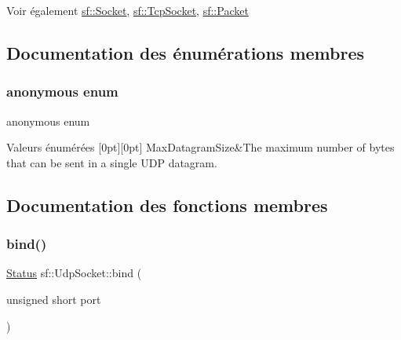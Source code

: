 \begin{DoxySeeAlso}{Voir également}
\hyperlink{classsf_1_1Socket}{sf\+::\+Socket}, \hyperlink{classsf_1_1TcpSocket}{sf\+::\+Tcp\+Socket}, \hyperlink{classsf_1_1Packet}{sf\+::\+Packet} 
\end{DoxySeeAlso}


\subsection{Documentation des énumérations membres}
\mbox{\label{classsf_1_1UdpSocket_a14c7b7816e33ed1ef1f2fdb2404c06b5}} 
\subsubsection{\texorpdfstring{anonymous enum}{anonymous enum}}
{\footnotesize\ttfamily anonymous enum}

\begin{DoxyEnumFields}{Valeurs énumérées}
[0pt][0pt]{}\mbox{\label{classsf_1_1UdpSocket_a14c7b7816e33ed1ef1f2fdb2404c06b5a728a7d33027bee0d65f70f964dd9c9eb}} 
Max\+Datagram\+Size&The maximum number of bytes that can be sent in a single U\+DP datagram. \\
\hline

\end{DoxyEnumFields}


\subsection{Documentation des fonctions membres}
\mbox{\label{classsf_1_1UdpSocket_ab0bf8d32849836f92beb2fd734565481}} 
\subsubsection{\texorpdfstring{bind()}{bind()}}
{\footnotesize\ttfamily \hyperlink{classsf_1_1Socket_a51bf0fd51057b98a10fbb866246176dc}{Status} sf\+::\+Udp\+Socket\+::bind (\begin{DoxyParamCaption}\item[{unsigned short}]{port }\end{DoxyParamCaption})}



